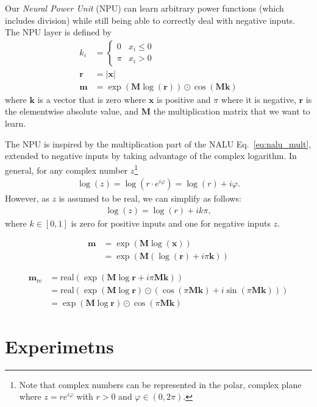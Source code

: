 \documentclass[9pt]{article}
\newcommand{\real}{\text{real}}
\begin{document}
Our \emph{Neural Power Unit} (NPU) can learn arbitrary power functions (which
includes division) while still being able to correctly deal with negative
inputs.  The NPU layer is defined by
\begin{align}
  k_i &= \begin{cases}
     0  & x_i \leq 0 \\
    \pi & x_i > 0
  \end{cases} \\
  \bm r &= |\bm x| \\
  \bm m &= \exp(\bm M \log(\bm r)) \odot \cos(\bm M \bm k)
\end{align}
where $\bm k$ is a vector that is zero where $\bm x$ is positive and $\pi$
where it is negative, $\bm r$ is the elementwise absolute value, and $\bm M$
the multiplication matrix that we want to learn.

The NPU is inspired by the multiplication part of the NALU
Eq.~\ref{eq:nalu_mult}, extended to negative inputs by taking advantage of the
complex logarithm. In general, for any complex number $z$\footnote{Note that
complex numbers can be represented in the polar, complex plane where
$z=re^{i\varphi}$ with $r>0$ and $\varphi \in (0,2\pi)$.}
\begin{align}
  \log(z) = \log\left(r\cdot e^{i\varphi}\right)
     = \log(r) + i\varphi.
\end{align}
However, as $z$ is assumed to be real, we can simplify as follows:
\begin{align}
  \log(z) = \log(r) + ik\pi,
\end{align}
where $k \in [0,1]$ is zero for positive inputs and one for negative inputs $z$.

\begin{align}
  \bm m &= \exp(\bm M \log(\bm x)) \\
    &= \exp(\bm M ( \log(\bm r) + i\pi\bm k ))
\end{align}

\begin{align}
  \bm m_{\text{re}} &= \real(\exp(\bm M \log \bm r + i\pi\bm M\bm k)) \\
    &= \real(\exp(\bm M \log \bm r) \odot (\cos(\pi \bm M \bm k) + i \sin(\pi \bm M \bm k))) \\
    &= \exp(\bm M \log \bm r) \odot \cos(\pi \bm M \bm k)
\end{align}

\section{Experimetns}%
\label{sec:experimetns}
\end{document}
